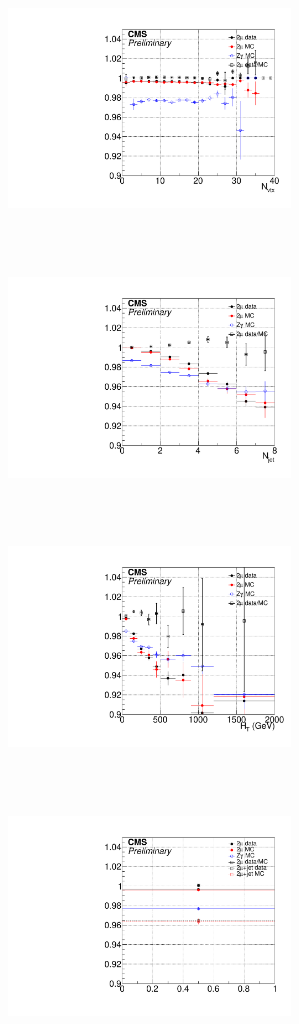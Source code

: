 \begin{figure}[tbph]
 \centering
  \includegraphics[width=7.5cm,height=7cm]{Calibration/Figures/leptonveto_eff_npv.pdf}
  \includegraphics[width=7.5cm,height=7cm]{Calibration/Figures/leptonveto_eff_njet.pdf}
  \includegraphics[width=7.5cm,height=7cm]{Calibration/Figures/leptonveto_eff_ht.pdf}
  \includegraphics[width=7.5cm,height=7cm]{Calibration/Figures/leptonveto_eff_incl.pdf}

\end{figure}
